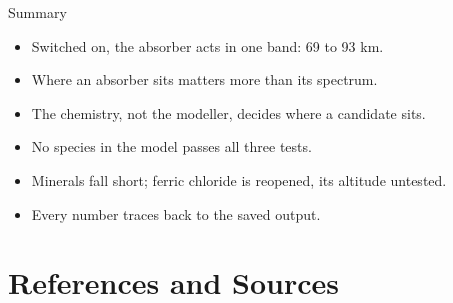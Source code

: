\documentclass[aspectratio=169,10pt,t,usepdftitle=false]{beamer}
\begin{document}
\begin{frame}{Summary}
  \vskip3mm
  \begin{itemize}\setlength{\itemsep}{4mm}
    \item Switched on, the absorber acts in one band: 69 to 93 km.
    \item Where an absorber sits matters more than its spectrum.
    \item The chemistry, not the modeller, decides where a candidate sits.
    \item No species in the model passes all three tests.
    \item Minerals fall short; ferric chloride is reopened, its altitude untested.
    \item Every number traces back to the saved output.
  \end{itemize}
  \vskip4mm
\end{frame}

\section{References and Sources}
\end{document}
